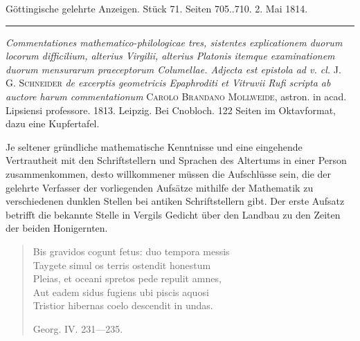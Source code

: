 \clearpage
{}
\hypertarget{native-572-lower}{}
\begin{center}\small Göttingische gelehrte Anzeigen. Stück 71. Seiten 705..710. 2. Mai 1814.\\[3pt]\rule{.72\linewidth}{.3pt}\end{center}

\emph{Commentationes mathematico-philologicae tres, sistentes explicationem duorum locorum difficilium, alterius Virgilii, alterius Platonis itemque examinationem duorum mensurarum praeceptorum Columellae. Adjecta est epistola ad v. cl.} J. G. \textsc{Schneider} \emph{de excerptis geometricis Epaphroditi et Vitruvii Rufi scripta ab auctore harum commentationum} \textsc{Carolo Brandano Mollweide}, astron. in acad. Lipsiensi professore. 1813. Leipzig. Bei Cnobloch. 122 Seiten im Oktavformat, dazu eine Kupfertafel.

Je seltener gründliche mathematische Kenntnisse und eine eingehende Vertrautheit mit den Schriftstellern und Sprachen des Altertums in einer Person zusammenkommen, desto willkommener müssen die Aufschlüsse sein, die der gelehrte Verfasser der vorliegenden Aufsätze mithilfe der Mathematik zu verschiedenen dunklen Stellen bei antiken Schriftstellern gibt. Der erste Aufsatz betrifft die bekannte Stelle in Vergils Gedicht über den Landbau zu den Zeiten der beiden Honigernten.

\begin{quote}\small Bis gravidos cogunt fetus: duo tempora messis \\ Taygete simul os terris ostendit honestum \\ Pleias, et oceani spretos pede repulit amnes, \\ Aut eadem sidus fugiens ubi piscis aquosi \\ Tristior hibernas coelo descendit in undas.

\hfill Georg. IV. 231---235. \end{quote}

